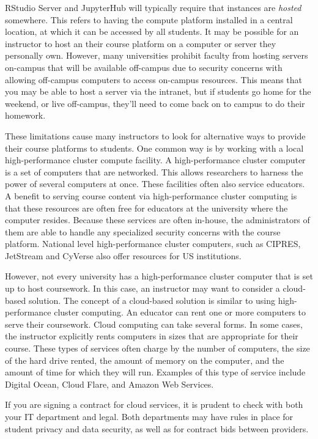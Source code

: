 RStudio Server and JupyterHub will typically require that instances are \textit{hosted} somewhere.
This refers to having the compute platform installed in a central location, at which it can be accessed by all students.
It may be possible for an instructor to host an their course platform on a computer or server they personally own.
However, many universities prohibit faculty from hosting servers on-campus that will be available off-campus due to security concerns with allowing off-campus computers to access on-campus resources.
This means that you may be able to host a server via the intranet, but if students go home for the weekend, or live off-campus, they'll need to come back on to campus to do their homework.

These limitations cause many instructors to look for alternative ways to provide their course platforms to students.
One common way is by working with a local high-performance cluster compute facility.
A high-performance cluster computer is a set of computers that are networked. 
This allows researchers to harness the power of several computers at once.
These facilities often also service educators.
A benefit to serving course content via high-performance cluster computing is that these resources are often free for educators at the university where the computer resides.
Because these services are often in-house, the administrators of them are able to handle any specialized security concerns with the course platform.
National level high-performance cluster computers, such as CIPRES, JetStream and CyVerse also offer resources for US institutions.

However, not every university has a high-performance cluster computer that is set up to host coursework. 
In this case, an instructor may want to consider a cloud-based solution. 
The concept of a cloud-based solution is similar to using high-performance cluster computing.
An educator can rent one or more computers to serve their coursework. 
Cloud computing can take several forms. 
In some cases, the instructor explicitly rents computers in sizes that are appropriate for their course.
These types of services often charge by the number of computers, the size of the hard drive rented, the amount of memory on the computer, and the amount of time for which they will run.
Examples of this type of service include Digital Ocean, Cloud Flare, and Amazon Web Services.

{\begin{framed}
If you are signing a contract for cloud services, it is prudent to check with both your IT department and legal. 
Both departments may have rules in place for student privacy and data security, as well as for contract bids between providers.
\end{framed}}

